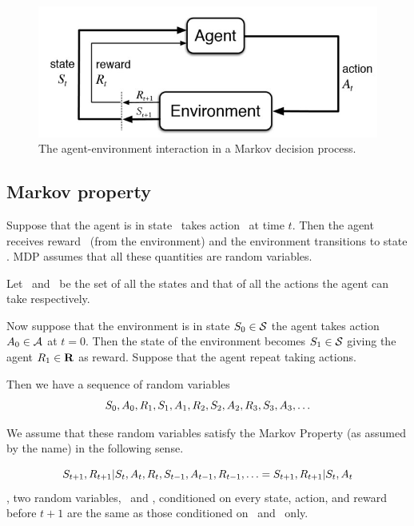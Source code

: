 \begin{figure}
\begin{center}
\includegraphics[width=.7\textwidth]{figures/reinforcement-learning}
\end{center}
\caption{The agent-environment interaction in a Markov decision process.}
\label{fig:mdp}
\end{figure}


\subsection{Markov property}


Suppose that the agent is in state \ takes action \ at time $t$.
Then the agent receives reward \ (from the environment) and the environment transitions to state .
MDP assumes that all these quantities are random variables.

Let \stateset\ and \actionset\ be the set of all the states and that of all the actions the agent can take respectively.

Now suppose that the environment is in state $S_{0}\in\mathcal{S}$ the agent takes action $A_{0}\in\mathcal{A}$ at $t=0$.
Then the state of the environment becomes $S_{1}\in\mathcal{S}$ giving the agent $R_{1}\in\mathbf{R}$ as reward.
Suppose that the agent repeat taking actions.

Then we have a sequence of random variables
\begin{equation}
S_{0}, A_{0},
R_{1}, S_{1}, A_{1},
R_{2}, S_{2}, A_{2},
R_{3}, S_{3}, A_{3},
\ldots
\end{equation}

We assume that these random variables satisfy the Markov Property (as assumed by the name) in the following sense.

\begin{equation}
S_{t+1}, R_{t+1} | S_{t}, A_{t}, R_{t}, S_{t-1}, A_{t-1}, R_{t-1}, \ldots
= S_{t+1}, R_{t+1} | S_{t}, A_{t}
\end{equation}
\ie, two random variables, \ and , conditioned on every state, action, and reward before $t+1$
are the same as those conditioned on \ and \ only.

